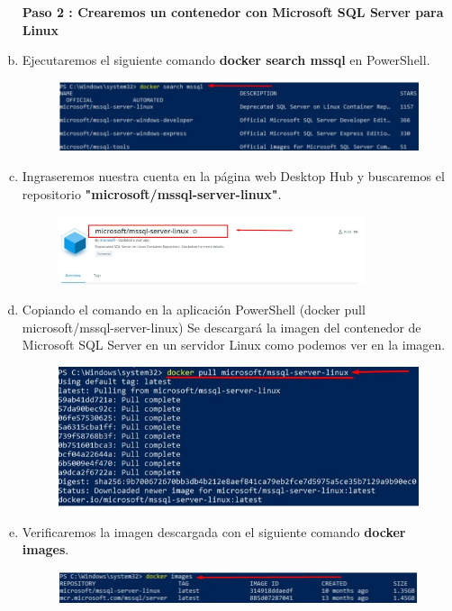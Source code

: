 \documentclass[preprint,12pt]{elsarticle}
\begin{document}
\begin{enumerate}[a)]
\textbf{Paso 2 : Crearemos un contenedor con Microsoft SQL Server para Linux}
\item Ejecutaremos el siguiente comando \textbf{docker search mssql} en PowerShell.
\begin{figure}[htb]
	\begin{center}
		\includegraphics[width=11cm]{./IMAGENES/Docker03}
	\end{center}
\end{figure}
\item Ingraseremos nuestra cuenta en la página web Desktop Hub y buscaremos el repositorio \textbf{"microsoft/mssql-server-linux"}. 
\begin{figure}[htb]
	\begin{center}
		\includegraphics[width=9cm]{./IMAGENES/Docker04}
	\end{center}
\end{figure}
\item Copiando el comando en la aplicación PowerShell (docker pull microsoft/mssql-server-linux)
Se descargará la imagen del contenedor de Microsoft SQL Server en un servidor Linux como podemos ver en la imagen.
\begin{figure}[htb]
	\begin{center}
		\includegraphics[width=11cm]{./IMAGENES/Docker05}
	\end{center}
\end{figure}


\item Verificaremos la imagen descargada con el siguiente comando \textbf{docker images}.
\begin{figure}[htb]
	\begin{center}
		\includegraphics[width=14cm]{./IMAGENES/Docker06}
	\end{center}
\end{figure}


\end{enumerate}
\end{document}
